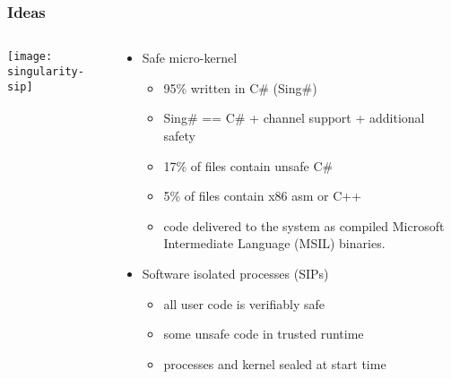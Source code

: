 \begin{frame}[plain]
	\frametitle{Ideas}
	
	
	
	\begin{columns}
		
		\begin{column}{.5\textwidth}
			
			\texttt{[image: singularity-sip]}
			
		\end{column}
		
		\begin{column}{.5\textwidth}
			
			\begin{itemize}
				\item Safe micro-kernel
					\begin{itemize}
						\item  95\% written in C\# (Sing\#)
						\item  Sing\# == C\# + channel support + additional safety
						\item 17\% of files contain unsafe C\#						
						\item 5\% of files contain x86 asm or C++
						\item  code delivered to the system as compiled Microsoft
						Intermediate Language (MSIL) binaries.
						
						
					\end{itemize}
				
					\item Software isolated processes (SIPs)
					
					\begin{itemize}
					\item  all user code is verifiably safe
					\item  some unsafe code in trusted runtime
					\item processes and kernel sealed at start time
					
				    \end{itemize} 

%
%						
%			    
			    
			    
			\end{itemize}	
			
		\end{column}
		
		
	\end{columns}
	
	
\end{frame}




